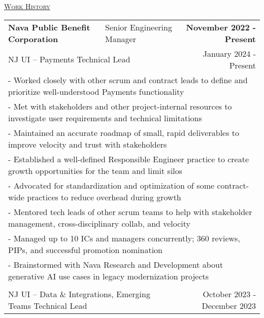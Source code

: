 \documentclass[letterpaper]{article}
\begin{document}
	\begin{center}
		\vspace{0.0in}
		\underline{\large \scshape Work History}
		\begin{tabular}{p{}p{}r}
			  \textbf{Nava Public Benefit Corporation} &
			  \quad\quad\quad Senior Engineering Manager &
			  \textbf{November 2022 - Present\quad}

			  \\
			  \multicolumn{2}{p{0.5\textwidth}}{\quad NJ UI -- Payments Technical Lead}
			  &
			  {January 2024 - Present \quad\quad\quad\quad}
		  \\
			  \multicolumn{3}{p{\textwidth}}{\quad\quad - Worked closely with other scrum and contract leads to define and prioritize well-understood Payments functionality} \\
			  \multicolumn{3}{p{\textwidth}}{\quad\quad - Met with stakeholders and other project-internal resources to investigate user requirements and technical limitations} \\
			  \multicolumn{3}{p{\textwidth}}{\quad\quad - Maintained an accurate roadmap of small, rapid deliverables to improve velocity and trust with stakeholders} \\
			  \multicolumn{3}{p{\textwidth}}{\quad\quad - Established a well-defined Responsible Engineer practice to create growth opportunities for the team and limit silos} \\
			  \multicolumn{3}{p{\textwidth}}{\quad\quad - Advocated for standardization and optimization of some contract-wide practices to reduce overhead during growth} \\
			  \multicolumn{3}{p{\textwidth}}{\quad\quad - Mentored tech leads of other scrum teams to help with stakeholder management, cross-disciplinary collab, and velocity } \\
			  \multicolumn{3}{p{\textwidth}}{\quad\quad - Managed up to 10 ICs and managers concurrently; 360 reviews, PIPs, and successful promotion nomination } \\
			  \multicolumn{3}{p{\textwidth}}{\quad\quad - Brainstormed with Nava Research and Development about generative AI use cases in legacy modernization projects} 
		  \\
		  \\
			  \multicolumn{2}{p{0.5\textwidth}}{\quad NJ UI -- Data \& Integrations, Emerging Teams Technical Lead}
			  &
			  {October 2023 - December 2023 \quad\quad\quad\quad}
		  \\

\end{tabular}
\end{center}
\end{document}
